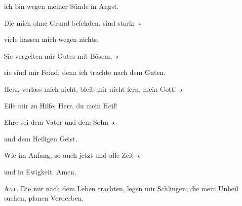 ich bin wegen meiner Sünde in Angst.
 
\noindent Die mich ohne Grund befehden, sind stark;~$\star$~\nopagebreak

viele hassen mich wegen nichts.
 
\noindent Sie vergelten mir Gutes mit Bösem,~$\star$~\nopagebreak

sie sind mir Feind; denn ich trachte nach dem Guten.
 
\noindent Herr, verlass mich nicht, bleib mir nicht fern, mein Gott!~$\star$~\nopagebreak

Eile mir zu Hilfe, Herr, du mein Heil!

\noindent Ehre sei dem Vater und dem Sohn~$\star$~\nopagebreak

und dem Heiligen Geist.

\noindent Wie im Anfang, so auch jetzt und alle Zeit~$\star$~\nopagebreak

und in Ewigkeit. Amen.

\vspace{10pt}

\noindent \textsc{Ant.} Die mir nach dem Leben trachten, legen mir Schlingen; die mein Unheil suchen, planen Verderben.

